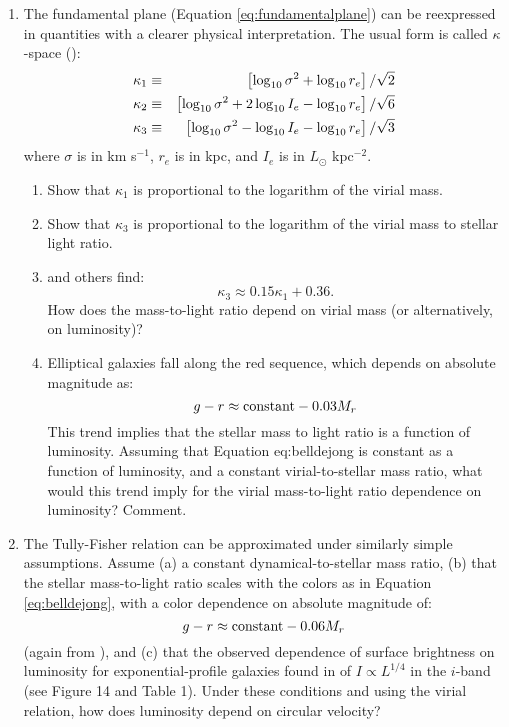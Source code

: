 \begin{enumerate}
\item The fundamental plane (Equation \ref{eq:fundamentalplane}) can
be reexpressed in quantities with a clearer physical
interpretation. The usual form is called $\kappa$-space
(\citealt{bender92a}): 
\begin{eqnarray}
\kappa_1 &\equiv& \left[ \log_{10} \sigma^2 + \log_{10} r_e \right]
/ \sqrt{2} \cr
\kappa_2 &\equiv& \left[ \log_{10} \sigma^2 + 2 \log_{10} I_e
- \log_{10} r_e \right] / \sqrt{6} \cr
\kappa_3 &\equiv& \left[ \log_{10} \sigma^2 - \log_{10} I_e
- \log_{10} r_e \right] / \sqrt{3}
\end{eqnarray}
where $\sigma$ is in km s$^{-1}$, $r_e$ is in kpc, and $I_e$ is in
$L_\odot$ kpc$^{-2}$. 
\begin{enumerate}
\item Show that $\kappa_1$ is proportional to the logarithm of the
virial mass.
\item Show that $\kappa_3$ is proportional to the logarithm of the
virial mass to stellar light ratio.
\item \cite{bender92a} and others find:
\begin{equation}
\kappa_3 \approx 0.15 \kappa_1 + 0.36.
\end{equation}
How does the mass-to-light ratio depend on virial mass (or
alternatively, on luminosity)?
\item Elliptical galaxies fall along the red sequence, which depends
on absolute magnitude as:
\begin{equation}
g-r \approx {\rm constant} - 0.03 M_r
\end{equation}
This trend implies that the stellar mass to light ratio is a function
of luminosity. Assuming that Equation {eq:belldejong} is constant as a
function of luminosity, and a constant virial-to-stellar mass ratio,
what would this trend imply for the virial mass-to-light ratio
dependence on luminosity? Comment.
\end{enumerate}
\item The Tully-Fisher relation can be approximated under similarly
simple assumptions. Assume (a) a constant dynamical-to-stellar mass ratio,
(b) that the stellar mass-to-light ratio scales with the colors as in
Equation \ref{eq:belldejong}, with a color dependence on absolute
magnitude of: 
\begin{equation}
g-r \approx {\rm constant} - 0.06 M_r
\end{equation}
(again from \citealt{blanton03d}), and (c) that the observed
dependence of surface brightness on luminosity for exponential-profile
galaxies found in \citet{blanton03d} of $I\propto L^{1/4}$ in the
$i$-band (see Figure 14 and Table 1). Under these conditions and using
the virial relation, how does luminosity depend on circular velocity?
\end{enumerate}

